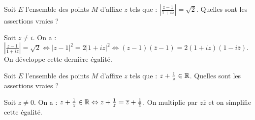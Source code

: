 \begin{question} 

Soit $E$ l'ensemble des points $M$ d'affixe $z$ tels que : $|\frac{z-1}{1+iz}|=\sqrt 2$. Quelles sont les assertions vraies ?
\begin{answers}
    
    
    
    
    
     

\end{answers}
\begin{explanations}
Soit $z \neq i$. On a :  $|\frac{z-1}{1+iz}|=\sqrt 2 \Leftrightarrow |z-1|^2=2|1+iz|^2 \Leftrightarrow
(z-1)(\overline{z}-1)=2 (1+iz)(1-i\overline{z})$. On développe cette dernière égalité.
\end{explanations}

\end{question}


\begin{question} 

Soit $E$ l'ensemble des points $M$ d'affixe $z$ tels que : $z+\frac{1}{z} \in \mathbb{R}$. Quelles sont les assertions vraies ?
\begin{answers}
    
    
    
    
    
     

\end{answers}
\begin{explanations}
Soit $z \neq 0$. On a :  $z+\frac{1}{z} \in \mathbb{R} \Leftrightarrow z+\frac{1}{z}  = \overline{z}+\frac{1}{\overline{z}}$. On multiplie par $z\overline{z}$ et on simplifie cette égalité. 

\end{explanations}

\end{question}


